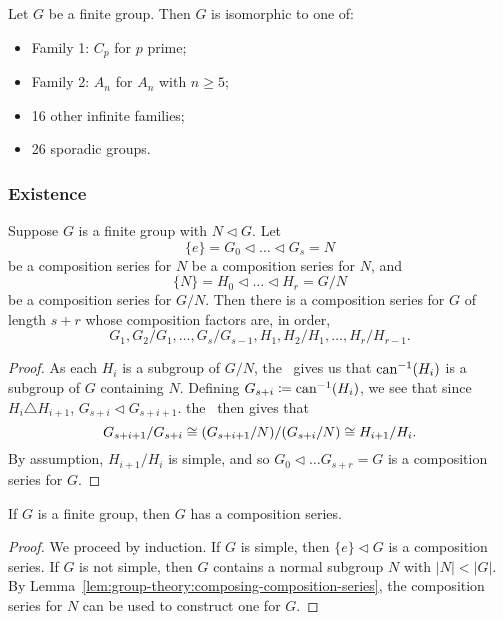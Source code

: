 \begin{theorem}
  Let \(G\) be a finite group. Then \(G\) is isomorphic to one of:
  \begin{itemize}
    \item Family 1: \(C_{p}\) for \(p\) prime;
    \item Family 2: \(A_{n}\) for \(A_{n}\) with \(n \geq 5\);
    \item 16 other infinite families;
    \item 26 sporadic groups.
  \end{itemize}
\end{theorem}

\subsubsection*{Existence}
\begin{lemma}\label{lem:group-theory:composing-composition-series}
  Suppose \(G\) is a finite group with \(N \triangleleft G\). Let
  \[\{e\} = G_{0} \triangleleft \ldots \triangleleft G_{s} = N \]
  be a composition series for \(N\) be a composition series for \(N\), and
  \[\{N\} = H_{0} \triangleleft \ldots \triangleleft H_{r} = G / N\]
  be a composition series for \(G/N\). Then there is a composition series for \(G\) of length \(s + r\) whose composition factors are, in order,
  \[G_{1}, G_{2}/G_{1}, \ldots, G_{s}/ G_{s-1}, H_{1}, H_{2}/H_{1}, \ldots, H_{r}/H_{r-1}.\]
\end{lemma}

\begin{proof}
  As each \(H_{i}\) is a subgroup of \(G/N\), the~ gives us that \(\operatorname{can}^{-1}(H_{i})\) is a subgroup of \(G\) containing \(N\). Defining \(G_{s + i} \coloneqq \operatorname{can}^{-1}(H_{i})\), we see that since \(H_{i} \triangle H_{i+1}\), \(G_{s+i} \triangleleft G_{s+i+1}\). the~ then gives that
  \[G_{s+i+1} / G_{s+i} \cong (G_{s+i+1} / N) / (G_{s + i} / N) \cong H_{i+1} / H_{i}.\]
  By assumption, \(H_{i+1} / H_{i}\) is simple, and so \(G_{0} \triangleleft \ldots G_{s+r} = G\) is a composition series for \(G\).
\end{proof}


\begin{proposition}
  If \(G\) is a finite group, then \(G\) has a composition series.
\end{proposition}

\begin{proof}
  We proceed by induction. If \(G\) is simple, then \(\{e\} \triangleleft G\) is a composition series. If \(G\) is not simple, then \(G\) contains a normal subgroup \(N\) with \(|N| < |G|\). By Lemma~\ref{lem:group-theory:composing-composition-series}, the composition series for \(N\) can be used to construct one for \(G\).
\end{proof}

